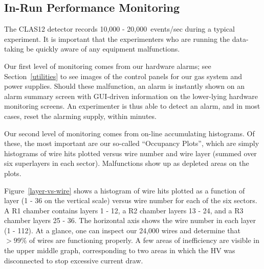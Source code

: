 \subsection{In-Run Performance Monitoring}

The CLAS12 detector records 10,000 - 20,000~events/sec during a typical experiment.
It is important that the experimenters who are running the data-taking be quickly
aware of any equipment malfunctions.

Our first level of monitoring comes from our hardware alarms; see Section~\ref{utilities}
to see images of the control panels for our gas system and power
supplies.  Should these malfunction, an alarm is instantly shown on an alarm summary
screen with GUI-driven information on the lower-lying hardware monitoring screens.
An experimenter is thus able to detect an alarm, and in most cases, reset the
alarming supply, within minutes.

Our second level of monitoring comes from on-line accumulating histograms.
Of these, the most important are our so-called ``Occupancy Plots'', which
are simply histograms of wire hits plotted versus wire number and wire layer (summed over
six superlayers in each sector).  Malfunctions show up
as depleted areas on the plots.

Figure~\ref{layer-vs-wire} shows a histogram of wire hits plotted as
a function of layer (1 - 36 on the vertical scale) versus wire number for each of the six
sectors.  A R1 chamber contains layers 1 - 12, a R2 chamber layers 13 - 24, and a 
R3 chamber layers 25 - 36. The horizontal axis shows the wire number in each layer (1 - 112).  
At a glance, one can inspect our 24,000 wires and determine
that $>99\%$ of wires are functioning properly.  A few areas of inefficiency
are visible in the upper middle graph, corresponding to
two areas in which the HV was disconnected to stop excessive current draw.

